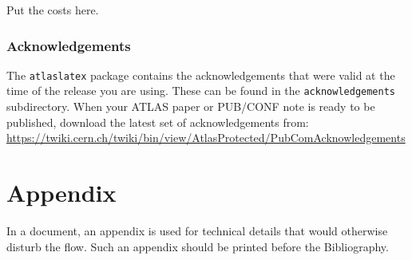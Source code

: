 \documentclass[BOOK, UKenglish, texlive=2016]{\ATLASLATEXPATH atlasdoc}
\begin{document}
Put the costs here.

\clearpage
\section*{Acknowledgements}

%

The \texttt{atlaslatex} package contains the acknowledgements that were valid 
at the time of the release you are using.
These can be found in the \texttt{acknowledgements} subdirectory.
When your ATLAS paper or PUB/CONF note is ready to be published,
download the latest set of acknowledgements from:\\
\url{https://twiki.cern.ch/twiki/bin/view/AtlasProtected/PubComAcknowledgements}


\clearpage
\appendix
\part*{Appendix}

In a document, an appendix is used for technical details that would otherwise disturb the flow.
Such an appendix should be printed before the Bibliography.


\printbibliography
%
%

\backmatter

\listoffigures
\listoftables
\end{document}
